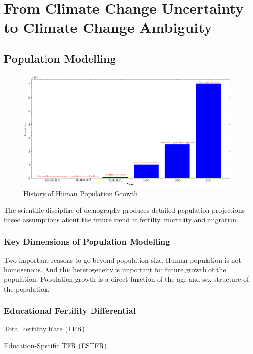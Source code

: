 \chapter{From Climate Change Uncertainty to Climate Change Ambiguity}


\section{Population Modelling}


\begin{figure}
\centering
\includegraphics[width=1\textwidth]{../images/population/history_population.png}
\caption{History of Human Population Growth}
\label{fig:population}
\end{figure}

The scientific discipline of demography 
produces detailed population projections based 
assumptions about the future trend in fertilty,
mortality and migration.

\subsection{Key Dimensions of Population Modelling}

Two important reasons to go beyond population size. 
Human population is not homogenous. And this 
heterogeneity is important for future growth 
of the population. Population growth is a 
direct function of the age and sex 
structure of the population.

\subsection{Educational Fertility Differential}

Total Fertility Rate (TFR)

Education-Specific TFR (ESTFR)

